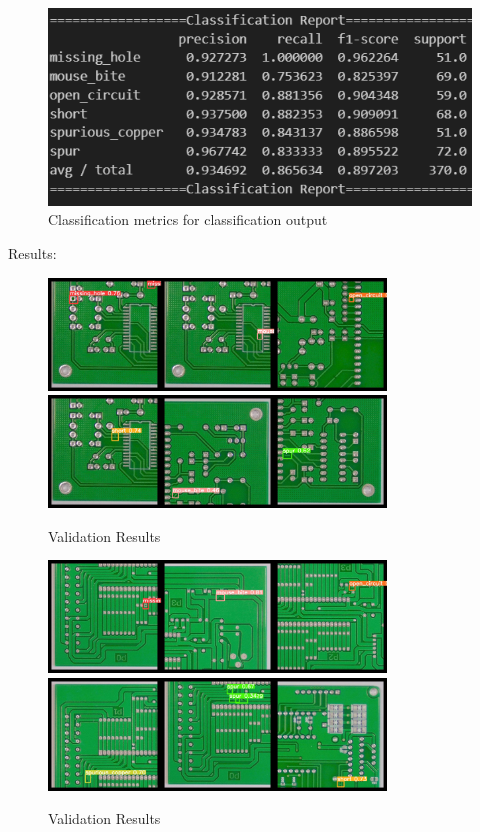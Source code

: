 \documentclass[12pt]{article}
\begin{document}
\clearpage

\begin{figure}[H]
    \centering
    \includegraphics[width=1\textwidth]{./graphics/classification_report_yolo.png}
    \caption{Classification metrics for classification output}
    \label{fig:classification_report_yolo}
\end{figure}

\clearpage

Results:
\begin{figure}[h]
    \centering
    \includegraphics[width=0.8\textwidth]{./graphics/results1_yolo.png}
    \includegraphics[width=0.8\textwidth]{./graphics/results2_yolo.png}
    \caption{Validation Results}
    \label{fig:results1_yolo}
\end{figure}
\begin{figure}[h]
    \centering
    \includegraphics[width=0.8\textwidth]{./graphics/results3_yolo.png}
    \includegraphics[width=0.8\textwidth]{./graphics/results4_yolo.png}
    \caption{Validation Results}
    \label{fig:results2_yolo}
\end{figure}
\end{document}
